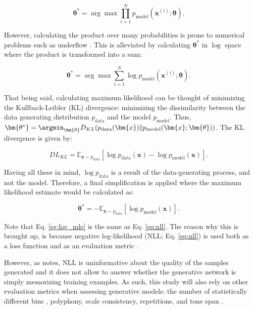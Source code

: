 \begin{equation}
    \bm{\theta^*} = \arg \max \prod_{i=1}^N p_{\text{model}}(\bm{x}^{(i)}; \bm{\theta}) \label{eq:og_mle}.
\end{equation}

However, calculating the product over many probabilities is prone to numerical problems such as underflow \parencite{goodfellow_nips_2016}. This is alleviated by calculating $\bm{\theta^*}$ in $\log$ space where the product is transformed into a sum:

\begin{equation}
    \bm{\theta^*} = \arg \max \sum_{i=1}^N \log p_{\text{model}}(\bm{x}^{(i)}; \bm{\theta}) \label{eg:log_mle}.
\end{equation}

That being said, calculating maximum likelihood can be thought of minimizing the Kullback-Leibler (KL) divergence: minimizing the dissimilarity between the data generating distribution $p_{\text{data}}$ and the model $p_{\text{model}}$. Thus, $\bm{\theta^*} = \argmin_{\bm{\theta}} D_{KL}(p_{\text{data}}(\bm{x}) \| p_{\text{model}} (\bm{x}; \bm{\theta}))$. The KL divergence is given by:

\begin{equation}
    DL_{KL} = \mathbb{E}_{\mathbf{x} \sim p_{\text{data}}} [\log p_{\text{data}} (\bm{x}) - \log p_{\text{model}} (\bm{x})] \label{eq:kl_div}.
\end{equation}

Having all these in mind, $\log p_{\text{data}}$ is a result of the data-generating process, and not the model. Therefore, a final simplification is applied where the maximum likelihood estimate would be calculated as:

\begin{equation}
    \bm{\theta^*} = - \mathbb{E}_{\mathbf{x} \sim p_{\text{data}}} [\log p_{\text{model}} (\bm{x})] \label{eq:nll}.
\end{equation}

Note that Eq. \ref{eg:log_mle} is the same as Eq. \ref{eq:nll}. The reason why this is brought up, is because negative log-likelihood (NLL; Eq. \ref{eq:nll}) is used both as a loss function and as an evaluation metric \parencite[also for generative models;][]{yu_seqgan_2016, borji_pros_2018}.

However, as \textcite{borji_pros_2018} notes, NLL is uninformative about the quality of the samples generated and it does not allow to answer whether the generative network is simply memorizing training examples. As such, this study will also rely on other evaluation metrics when assessing generative models: the number of statistically different bins \parencite[NDB;][]{richardson_gans_2018}, polyphony, scale consistency, repetitions, and tone span \parencite{mogren_c-rnn-gan_2016}.

